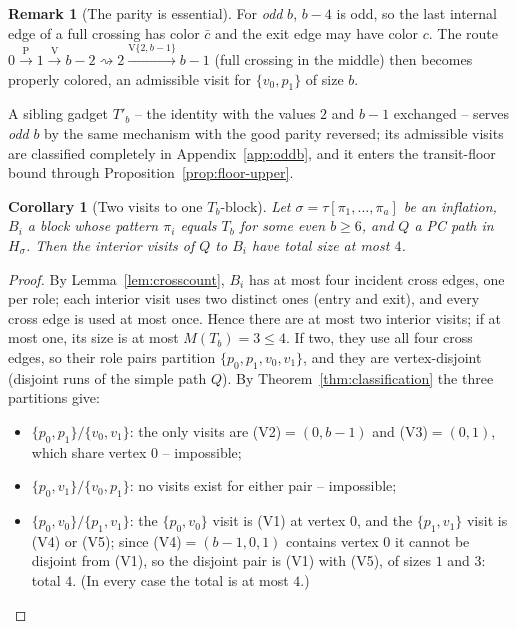 \documentclass[11pt]{article}
\newtheorem{corollary}[theorem]{Corollary}
\theoremstyle{definition}
\newtheorem{remark}[theorem]{Remark}
\begin{document}
\begin{remark}[The parity is essential]\label{rem:parity}
For \emph{odd} $b$, $b - 4$ is odd, so the last internal edge of a full crossing has
color $\bar c$ and the exit edge may have color $c$. The route
$0 \xrightarrow{\mathrm P} 1 \xrightarrow{\mathrm V} b-2 \rightsquigarrow 2
\xrightarrow{\mathrm V\{2,b-1\}} b-1$ (full crossing in the middle) then becomes
properly colored, an admissible visit for $\{v_0, p_1\}$ of size $b$.
\end{remark}

A sibling gadget $T'_b$ -- the identity with the values $2$ and $b{-}1$ exchanged --
serves \emph{odd} $b$ by the same mechanism with the good parity reversed; its
admissible visits are classified completely in Appendix~\ref{app:oddb}, and it enters
the transit-floor bound through Proposition~\ref{prop:floor-upper}.

\begin{corollary}[Two visits to one $T_b$-block]\label{cor:pairs}
Let $\sigma = \tau[\pi_1, \dots, \pi_a]$ be an inflation, $B_i$ a block whose pattern
$\pi_i$ equals $T_b$ for some even $b \ge 6$, and $Q$ a PC path in $H_\sigma$. Then the
interior visits of $Q$ to $B_i$ have total size at most $4$.
\end{corollary}

\begin{proof}
By Lemma~\ref{lem:crosscount}, $B_i$ has at most four incident cross edges, one per
role; each interior visit uses two distinct ones (entry and exit), and every cross edge
is used at most once. Hence there are at most two interior visits; if at most one, its
size is at most $M(T_b)=3\le4$. If two, they use all four cross edges, so their role
pairs partition $\{p_0, p_1, v_0, v_1\}$, and they are vertex-disjoint (disjoint runs of
the simple path $Q$). By Theorem~\ref{thm:classification} the three partitions give:
\begin{itemize}
\item $\{p_0, p_1\}/\{v_0, v_1\}$: the only visits are (V2)$=(0,b-1)$ and (V3)$=(0,1)$,
which share vertex $0$ -- impossible;
\item $\{p_0, v_1\}/\{v_0, p_1\}$: no visits exist for either pair -- impossible;
\item $\{p_0, v_0\}/\{p_1, v_1\}$: the $\{p_0,v_0\}$ visit is (V1) at vertex $0$, and
the $\{p_1,v_1\}$ visit is (V4) or (V5); since (V4)$=(b-1,0,1)$ contains vertex $0$ it
cannot be disjoint from (V1), so the disjoint pair is (V1) with (V5), of sizes $1$ and
$3$: total $4$. (In every case the total is at most $4$.)
\end{itemize}
\end{proof}
\end{document}

